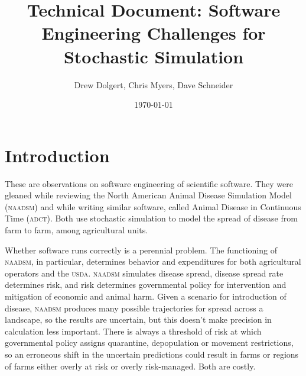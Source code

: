 \documentclass{article}
\title{Technical Document: Software Engineering Challenges for Stochastic Simulation}
\author{Drew Dolgert, Chris Myers, Dave Schneider}
\date{\today}
\begin{document}
\maketitle

\newcommand{\naadsm}{\textsc{naadsm}\xspace}
\newcommand{\adct}{\textsc{adct}\xspace}
\newcommand{\CC}{C\nolinebreak\hspace{-.05em}\raisebox{.4ex}{\tiny\bf +}\nolinebreak\hspace{-.10em}\raisebox{.4ex}{\tiny\bf +}\xspace}

\tableofcontents

\section{Introduction}
These are observations on software engineering of
scientific software. They were gleaned while reviewing
the North American Animal Disease Simulation Model (\naadsm) and while
writing similar software, called Animal Disease in
Continuous Time (\adct). Both use stochastic simulation
to model the spread of disease from farm to farm,
among agricultural units.

Whether software runs correctly is a perennial problem\cite{hoare1996}.
The functioning of \naadsm, in particular, determines behavior
and expenditures for both agricultural operators and the \textsc{usda}.
\naadsm simulates disease spread, disease spread rate determines
risk, and risk determines governmental policy for intervention
and mitigation of economic and animal harm.
Given a scenario for introduction of disease, \naadsm produces
many possible trajectories for spread across a landscape, so the
results are uncertain, but this doesn't make precision in calculation
less important. There is always a threshold of risk at which
governmental policy assigns quarantine, depopulation or movement
restrictions, so an erroneous shift in the uncertain predictions
could result in farms or regions of farms either overly at risk
or overly risk-managed. Both are costly.
\end{document}
